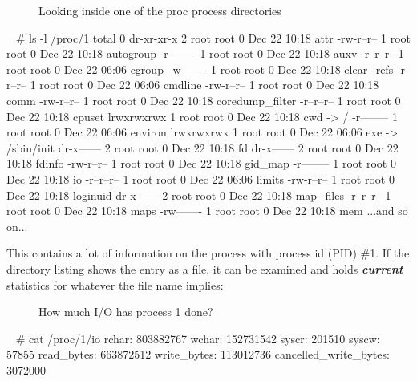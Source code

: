 \documentclass[10pt,american,]{book}
\newenvironment{Shaded}{\begin{snugshade}}{\end{snugshade}}
\newcommand{\KeywordTok}[1]{\textcolor[rgb]{0.13,0.29,0.53}{\textbf{{#1}}}}
\newcommand{\CommentTok}[1]{\textcolor[rgb]{0.56,0.35,0.01}{\textit{{#1}}}}
\newcommand{\NormalTok}[1]{{#1}}
\numberwithin{figure}{chapter}
\DeclareRobustCommand{\drcap}[1]{\begin{figure}[H]\caption{#1}\end{figure}}
\renewcommand{\KeywordTok}[1]{{#1}}
\renewcommand{\CommentTok}[1]{{#1}}
\renewcommand{\NormalTok}[1]{{#1}}
\begin{document}
\drcap{Looking inside one of the proc process directories}

\begin{Shaded}
\begin{Highlighting}[]
\KeywordTok{~} \CommentTok{# ls -l /proc/1}
\KeywordTok{total} \NormalTok{0}
\KeywordTok{dr-xr-xr-x} \NormalTok{2 root root 0 Dec 22 10:18 attr}
\KeywordTok{-rw-r--r--} \NormalTok{1 root root 0 Dec 22 10:18 autogroup}
\KeywordTok{-r--------} \NormalTok{1 root root 0 Dec 22 10:18 auxv}
\KeywordTok{-r--r--r--} \NormalTok{1 root root 0 Dec 22 06:06 cgroup}
\KeywordTok{--w-------} \NormalTok{1 root root 0 Dec 22 10:18 clear_refs}
\KeywordTok{-r--r--r--} \NormalTok{1 root root 0 Dec 22 06:06 cmdline}
\KeywordTok{-rw-r--r--} \NormalTok{1 root root 0 Dec 22 10:18 comm}
\KeywordTok{-rw-r--r--} \NormalTok{1 root root 0 Dec 22 10:18 coredump_filter}
\KeywordTok{-r--r--r--} \NormalTok{1 root root 0 Dec 22 10:18 cpuset}
\KeywordTok{lrwxrwxrwx} \NormalTok{1 root root 0 Dec 22 10:18 cwd -}\KeywordTok{>} \NormalTok{/}
\KeywordTok{-r--------} \NormalTok{1 root root 0 Dec 22 06:06 environ}
\KeywordTok{lrwxrwxrwx} \NormalTok{1 root root 0 Dec 22 06:06 exe -}\KeywordTok{>} \NormalTok{/sbin/init}
\KeywordTok{dr-x------} \NormalTok{2 root root 0 Dec 22 10:18 fd}
\KeywordTok{dr-x------} \NormalTok{2 root root 0 Dec 22 10:18 fdinfo}
\KeywordTok{-rw-r--r--} \NormalTok{1 root root 0 Dec 22 10:18 gid_map}
\KeywordTok{-r--------} \NormalTok{1 root root 0 Dec 22 10:18 io}
\KeywordTok{-r--r--r--} \NormalTok{1 root root 0 Dec 22 06:06 limits}
\KeywordTok{-rw-r--r--} \NormalTok{1 root root 0 Dec 22 10:18 loginuid}
\KeywordTok{dr-x------} \NormalTok{2 root root 0 Dec 22 10:18 map_files}
\KeywordTok{-r--r--r--} \NormalTok{1 root root 0 Dec 22 10:18 maps}
\KeywordTok{-rw-------} \NormalTok{1 root root 0 Dec 22 10:18 mem}
\KeywordTok{...and} \NormalTok{so on...}
\end{Highlighting}
\end{Shaded}

This contains a lot of information on the process with process id (PID)
\#1. If the directory listing shows the entry as a file, it can be
examined and holds \textbf{\emph{current}} statistics for whatever the
file name implies:

\drcap{How much I/O has process 1 done?}

\begin{Shaded}
\begin{Highlighting}[]
\KeywordTok{~} \CommentTok{# cat /proc/1/io}
\KeywordTok{rchar}\NormalTok{: 803882767}
\KeywordTok{wchar}\NormalTok{: 152731542}
\KeywordTok{syscr}\NormalTok{: 201510}
\KeywordTok{syscw}\NormalTok{: 57855}
\KeywordTok{read_bytes}\NormalTok{: 663872512}
\KeywordTok{write_bytes}\NormalTok{: 113012736}
\KeywordTok{cancelled_write_bytes}\NormalTok{: 3072000}
\end{Highlighting}
\end{Shaded}
\end{document}
